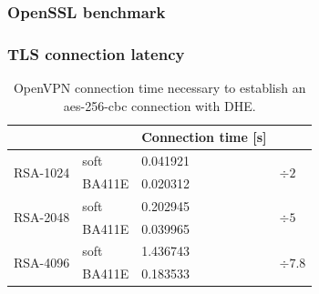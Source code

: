 \documentclass[xcolor={x11names, rgb, usenames, dvipsnames}]{beamer}
\begin{document}
\begin{frame}[noframenumbering]
\frametitle{OpenSSL benchmark}
	\begin{figure}
	
	\end{figure}
\end{frame}



\begin{frame}[noframenumbering]
\frametitle{TLS connection latency}
\begin{table}[ht]
\center
\begin{tabular}{ll|l|l} \cline{3-3}
 & & Connection time [s] & \\ \hline
\multicolumn{1}{|l|}{\multirow{2}{*}{RSA-1024}} & soft & 0.041921 & \multicolumn{1}{l|}{\multirow{2}{*}{$\div 2$}} \\ \cline{2-3}
\multicolumn{1}{|l|}{} & BA411E & 0.020312 & \multicolumn{1}{|l|}{} \\ \hline
\multicolumn{1}{|l|}{\multirow{2}{*}{RSA-2048}} & soft & 0.202945 & \multicolumn{1}{l|}{\multirow{2}{*}{$\div 5$}} \\ \cline{2-3}
\multicolumn{1}{|l|}{} & BA411E & 0.039965 & \multicolumn{1}{|l|}{} \\ \hline
\multicolumn{1}{|l|}{\multirow{2}{*}{RSA-4096}} & soft & 1.436743 & \multicolumn{1}{l|}{\multirow{2}{*}{$\div 7.8$}} \\ \cline{2-3}
\multicolumn{1}{|l|}{} & BA411E & 0.183533 & \multicolumn{1}{|l|}{} \\ \hline
\end{tabular}
\caption{OpenVPN connection time necessary to establish an aes-256-cbc connection with DHE.}
\end{table}
\end{frame}



% 
% 
\end{document}

